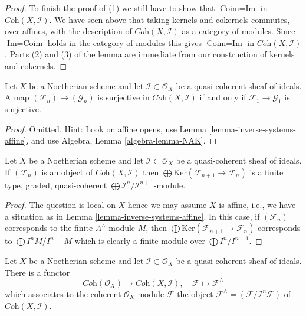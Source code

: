 \begin{proof}
\medskip\noindent
To finish the proof of (1) we still have to show that $\text{Coim} = \text{Im}$
in $\textit{Coh}(X, \mathcal{I})$. We have seen above that taking
kernels and cokernels commutes, over affines, with the description
of $\textit{Coh}(X, \mathcal{I})$ as a category of modules. Since
$\text{Im} = \text{Coim}$ holds in the category of modules
this gives $\text{Coim} = \text{Im}$ in $\textit{Coh}(X, \mathcal{I})$.
Parts (2) and (3) of the lemma are immediate from our construction
of kernels and cokernels.
\end{proof}

\begin{lemma}
\label{lemma-inverse-systems-surjective}
Let $X$ be a Noetherian scheme and let $\mathcal{I} \subset \mathcal{O}_X$
be a quasi-coherent sheaf of ideals. A map
$(\mathcal{F}_n) \to (\mathcal{G}_n)$ is surjective in
$\textit{Coh}(X, \mathcal{I})$
if and only if $\mathcal{F}_1 \to \mathcal{G}_1$ is surjective.
\end{lemma}

\begin{proof}
Omitted. Hint: Look on affine opens, use
Lemma \ref{lemma-inverse-systems-affine}, and use
Algebra, Lemma \ref{algebra-lemma-NAK}.
\end{proof}

\begin{lemma}
\label{lemma-finite-over-rees-algebra}
Let $X$ be a Noetherian scheme and let $\mathcal{I} \subset \mathcal{O}_X$
be a quasi-coherent sheaf of ideals. If $(\mathcal{F}_n)$ is an object of
$\textit{Coh}(X, \mathcal{I})$ then
$\bigoplus \text{Ker}(\mathcal{F}_{n + 1} \to \mathcal{F}_n)$ is
a finite type, graded, quasi-coherent
$\bigoplus \mathcal{I}^n/\mathcal{I}^{n + 1}$-module.
\end{lemma}

\begin{proof}
The question is local on $X$ hence we may assume $X$ is affine, i.e.,
we have a situation as in Lemma \ref{lemma-inverse-systems-affine}.
In this case, if $(\mathcal{F}_n)$ corresponds to the finite $A^\wedge$
module $M$, then $\bigoplus \text{Ker}(\mathcal{F}_{n + 1} \to \mathcal{F}_n)$
corresponds to $\bigoplus I^nM/I^{n + 1}M$ which is clearly a finite
module over $\bigoplus I^n/I^{n + 1}$.
\end{proof}

\noindent
Let $X$ be a Noetherian scheme and let $\mathcal{I} \subset \mathcal{O}_X$
be a quasi-coherent sheaf of ideals. There is a functor
\begin{equation}
\label{equation-completion-functor}
\textit{Coh}(\mathcal{O}_X) \longrightarrow \textit{Coh}(X, \mathcal{I}), \quad
\mathcal{F} \longmapsto \mathcal{F}^\wedge
\end{equation}
which associates to the coherent $\mathcal{O}_X$-module $\mathcal{F}$
the object $\mathcal{F}^\wedge = (\mathcal{F}/\mathcal{I}^n\mathcal{F})$
of $\textit{Coh}(X, \mathcal{I})$.

